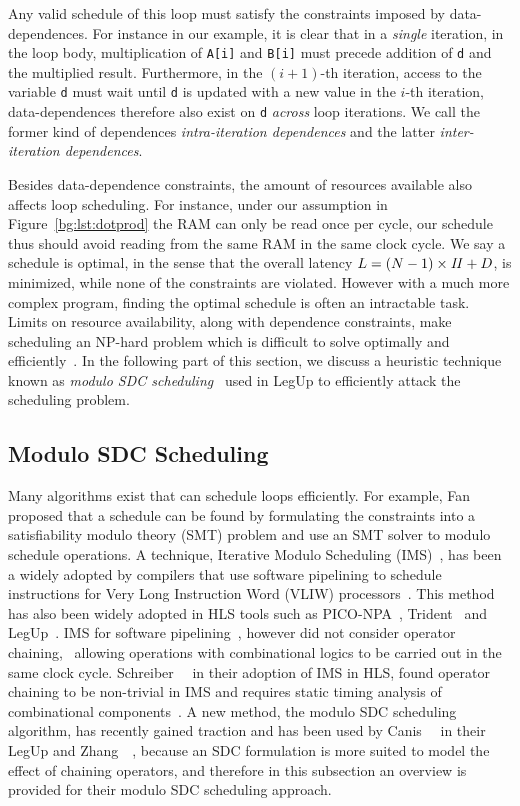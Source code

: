 Any valid schedule of this loop must satisfy the constraints imposed by
data-dependences.  For instance in our example, it is clear that in a
\emph{single} iteration, in the loop body, multiplication of \verb|A[i]|
and \verb|B[i]| must precede addition of \verb|d| and the multiplied
result.  Furthermore, in the $(i + 1)$-th iteration, access to the variable
\verb|d| must wait until \verb|d| is updated with a new value in the $i$-th
iteration, data-dependences therefore also exist on \verb|d| \emph{across}
loop iterations.  We call the former kind of dependences \emph{intra-iteration
dependences} and the latter \emph{inter-iteration dependences}.

Besides data-dependence constraints, the amount of resources available
also affects loop scheduling.  For instance, under our assumption in
Figure~\ref{bg:lst:dotprod} the RAM can only be read once per cycle, our
schedule thus should avoid reading from the same RAM in the same clock cycle.
We say a schedule is optimal, in the sense that the overall latency $L = (N -
1) \times \mathit{II} + D$, is minimized, while none of the constraints are violated.
However with a much more complex program, finding the optimal schedule is
often an intractable task.  Limits on resource availability, along with
dependence constraints, make scheduling an NP-hard problem which is difficult
to solve optimally and efficiently~\cite{hwang91}.  In the following part
of this section, we discuss a heuristic technique known as \emph{modulo SDC
scheduling}~\cite{zhang13, canis14} used in LegUp to efficiently attack the
scheduling problem.


\subsection{Modulo SDC Scheduling}
\label{bg:sub:modulo_sdc_scheduling}

Many algorithms exist that can schedule loops efficiently.  For example,
Fan~\etal~\cite{fan08} proposed that a schedule can be found by formulating
the constraints into a satisfiability modulo theory (SMT) problem and use
an SMT solver to modulo schedule operations.  A technique, Iterative Modulo
Scheduling (IMS)~\cite{rau94}, has been a widely adopted by compilers that use
software pipelining to schedule instructions for Very Long Instruction Word
(VLIW) processors~\cite{mcnairy03}.  This method has also been widely adopted
in HLS tools such as PICO-NPA~\cite{schreiber02}, Trident~\cite{tripp05} and
LegUp~\cite{canis13, canis14}.  IMS for software pipelining~\cite{rau94},
however did not consider operator chaining, \ie~allowing operations
with combinational logics to be carried out in the same clock cycle.
Schreiber~\etal~\cite{schreiber02} in their adoption of IMS in HLS, found
operator chaining to be non-trivial in IMS and requires static timing analysis
of combinational components~\cite{canis14}.  A new method, the modulo SDC
scheduling algorithm, has recently gained traction and has been used by
Canis~\etal~\cite{canis14} in their LegUp and Zhang~\etal~\cite{zhang13},
because an SDC formulation is more suited to model the effect of chaining
operators, and therefore in this subsection an overview is provided for their
modulo SDC scheduling approach.

